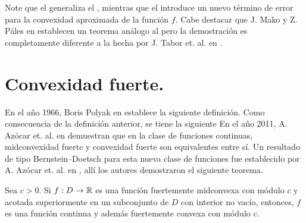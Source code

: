 Note que el  generaliza el , mientras que
el  introduce un nuevo término de error para la 
convexidad aproximada de la función $f$. Cabe destacar que 
J. Mako y Z. Páles en \cite[Teorema 26]{MakPal12a} establecen un teorema 
análogo al  pero la demostración es completamente
diferente a la hecha por J. Tabor et. al. en \cite{TabTab09b}.

%

\section{Convexidad fuerte.}

En el año 1966, Boris Polyak en \cite{Pol66} establece la siguiente definición.
Como consecuencia de la definición anterior, se tiene la siguiente
En el año 2011, A. Azócar et. al. en \cite{AzoGimNikSan11} demuestran
que en la clase de funciones continuas, midconvexidad fuerte
y convexidad fuerte son equivalentes entre sí. 
Un resultado de tipo Bernstein--Doetsch para esta nueva 
clase de funciones fue establecido por A. Azócar et. al.
en \cite{AzoGimNikSan11}, allí los autores demostraron el 
siguiente teorema.
\begin{theorem}
\label{azoBD}
Sea $c>0$. Si $f:D\to\mathbb{R}$ es una función fuertemente midconvexa 
con módulo $c$ y acotada superiormente en un subconjunto de $D$ 
con interior no vacío, entonces, $f$ es una función continua
y además fuertemente convexa con módulo $c$.
\end{theorem}

